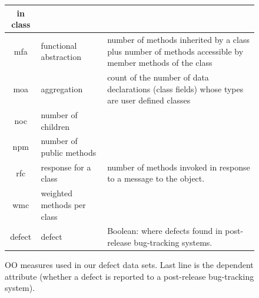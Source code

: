 \documentclass[conference]{IEEEtran}
\begin{document}
\begin{figure}[htbp!]
\begin{center}
{\begin{tabular}{c|l|p{4.7in}}
        in class\\\hline
        mfa & functional abstraction & number of methods inherited by a class
        plus number of methods accessible by member methods of the
        class\\\hline
        moa &  aggregation &  count of the number of data declarations (class
        fields) whose types are user defined classes\\\hline
        noc &  number of children &\\\hline
        npm & number of public methods & \\\hline
        rfc & response for a class &number of  methods invoked in response to
        a message to the object.\\\hline
        wmc & weighted methods per class &\\\hline
        \rowcolor{lightgray}
        defect & defect & Boolean: where defects found in post-release bug-tracking systems.
      \end{tabular}
    }
  \end{center}
  \caption{OO measures used in our defect data sets.  Last line is
    the dependent attribute (whether a defect is reported to  a
    post-release bug-tracking system).}\label{fig:ck}
\end{figure}
\end{document}
